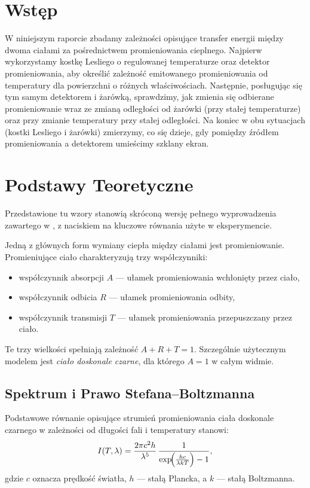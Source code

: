 \documentclass[12pt]{article}
\begin{document}
\newpage
\section{Wstęp}
W niniejszym raporcie zbadamy zależności opisujące transfer energii między dwoma ciałami za pośrednictwem promieniowania cieplnego. Najpierw wykorzystamy kostkę Lesliego o regulowanej temperaturze oraz detektor promieniowania, aby określić zależność emitowanego promieniowania od temperatury dla powierzchni o różnych właściwościach. Następnie, posługując się tym samym detektorem i żarówką, sprawdzimy, jak zmienia się odbierane promieniowanie wraz ze zmianą odległości od żarówki (przy stałej temperaturze) oraz przy zmianie temperatury przy stałej odległości. Na koniec w obu sytuacjach (kostki Lesliego i żarówki) zmierzymy, co się dzieje, gdy pomiędzy źródłem promieniowania a detektorem umieścimy szklany ekran.

\section{Podstawy Teoretyczne}
Przedstawione tu wzory stanowią skróconą wersję pełnego wyprowadzenia zawartego w \cite{skrypt}, z naciskiem na kluczowe równania użyte w eksperymencie.

Jedną z głównych form wymiany ciepła między ciałami jest promieniowanie. Promieniujące ciało charakteryzują trzy współczynniki:
\begin{itemize}[noitemsep]
    \item współczynnik absorpcji $A$ — ułamek promieniowania wchłonięty przez ciało,
    \item współczynnik odbicia $R$ — ułamek promieniowania odbity,
    \item współczynnik transmisji $T$ — ułamek promieniowania przepuszczany przez ciało.
\end{itemize}
Te trzy wielkości spełniają zależność $A + R + T = 1$. Szczególnie użytecznym modelem jest \emph{ciało doskonale czarne}, dla którego $A=1$ w całym widmie.

\subsection{Spektrum i Prawo Stefana–Boltzmanna}
Podstawowe równanie opisujące strumień promieniowania ciała doskonale czarnego w zależności od długości fali i temperatury stanowi:
\begin{equation}
	I(T, \lambda) = \frac{2\pi c^2 h}{\lambda^5}\,\frac{1}{\exp\!\Bigl(\tfrac{hc}{\lambda k T}\Bigr)-1},
	\label{eq:emision_spectrum}
\end{equation}
gdzie $c$ oznacza prędkość światła, $h$ — stałą Plancka, a $k$ — stałą Boltzmanna. 
\end{document}
